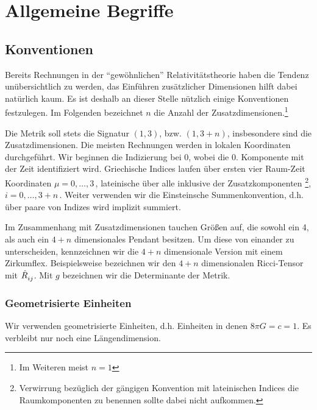 \chapter{Allgemeine Begriffe}

\section{Konventionen}
Bereits Rechnungen in der "`gewöhnlichen"' Relativitätstheorie haben die Tendenz
unübersichtlich zu werden, das Einführen zusätzlicher Dimensionen hilft dabei
natürlich kaum.
Es ist deshalb an dieser Stelle nützlich einige Konventionen festzulegen. Im
Folgenden bezeichnet $n$ die Anzahl der Zusatzdimensionen.\footnote{Im Weiteren
meist $n=1$}

Die Metrik soll stets die Signatur $(1,3)$, bzw. $(1,3+n)$, insbesondere sind
die Zusatzdimensionen. Die meisten Rechnungen werden in lokalen Koordinaten
durchgeführt.
Wir beginnen die Indizierung bei 0, wobei die 0. Komponente mit der Zeit identifiziert wird.
Griechische Indices laufen über ersten vier Raum-Zeit Koordinaten
$\mu=0,\ldots,3\,$, lateinische über alle inklusive der
Zusatzkomponenten \footnote{Verwirrung bezüglich der gängigen Konvention
mit lateinischen Indices die Raumkomponenten zu benennen sollte dabei nicht
aufkommen.}, $i=0,\ldots,3+n\,$. Weiter verwenden wir die Einsteinsche
Summenkonvention, d.h. über paare von Indizes wird implizit summiert.

Im Zusammenhang mit Zusatzdimensionen tauchen Größen auf, die sowohl ein 4, als
auch ein $4+n$ dimensionales Pendant besitzen. Um diese von einander zu
unterscheiden, kennzeichnen wir die $4+n$ dimensionale Version mit einem
Zirkumflex.
Beispielsweise bezeichnen wir den $4+n$ dimensionalen Ricci-Tensor mit
$\tensor{\hat{R}}{_i_j}$. Mit $g$ bezeichnen wir die Determinante der Metrik.
\subsection*{Geometrisierte Einheiten}
Wir verwenden geometrisierte Einheiten, d.h. Einheiten in denen
$8\pi G=c=1$. Es verbleibt nur noch eine Längendimension.
